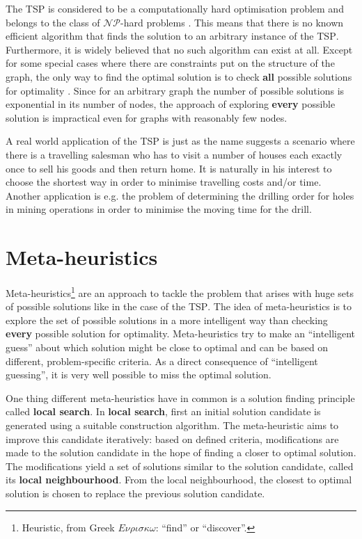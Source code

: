 The \textsc{TSP} is considered to be a computationally hard optimisation problem and belongs to the class of $\mathcal{NP}$-hard problems \cite{Garey:1979:CIG:578533}. This means that there is no known efficient algorithm that finds the solution to an arbitrary instance of the \textsc{TSP}. Furthermore, it is widely believed that no such algorithm can exist at all. Except for some special cases where there are constraints put on the structure of the graph, the only way to find the optimal solution is to check \textbf{all} possible solutions for optimality \cite{}. Since for an arbitrary graph the number of possible solutions is exponential in its number of nodes, the approach of exploring \textbf{every} possible solution is impractical even for graphs with reasonably few nodes.

A real world application of the \textsc{TSP} is just as the name suggests a scenario where there is a travelling salesman who has to visit a number of houses each exactly once to sell his goods and then return home. It is naturally in his interest to choose the shortest way in order to minimise travelling costs and/or time. Another application is e.g. the problem of determining the drilling order for holes in mining operations in order to minimise the moving time for the drill.

\section{Meta-heuristics}
\label{chp:meta_heuristics}
Meta-heuristics\footnote{Heuristic, from Greek $E\nu\rho\iota\sigma\kappa\omega$: \enquote{find} or \enquote{discover}.} are an approach to tackle the problem that arises with huge sets of possible solutions like in the case of the \textsc{TSP}. The idea of meta-heuristics is to explore the set of possible solutions in a more intelligent way than checking \textbf{every} possible solution for optimality. Meta-heuristics try to make an \enquote{intelligent guess} about which solution might be close to optimal and can be based on different, problem-specific criteria. As a direct consequence of \enquote{intelligent guessing}, it is very well possible to miss the optimal solution.

One thing different meta-heuristics have in common is a solution finding principle called \textbf{local search}. In \textbf{local search}, first an initial solution candidate is generated using a suitable construction algorithm. The meta-heuristic aims to improve this candidate iteratively: based on defined criteria, modifications are made to the solution candidate in the hope of finding a closer to optimal solution. The modifications yield a set of solutions similar to the solution candidate, called its \textbf{local neighbourhood}. From the local neighbourhood, the closest to optimal solution is chosen to replace the previous solution candidate.

